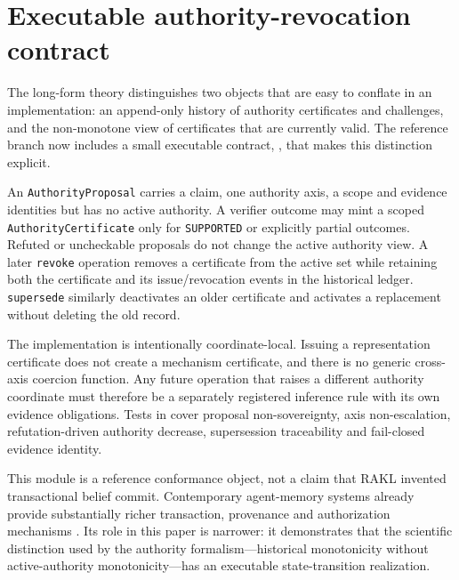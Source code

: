 \documentclass[11pt]{article}
\begin{document}
\section{Executable authority-revocation contract}

The long-form theory distinguishes two objects that are easy to conflate in an implementation: an append-only history of authority certificates and challenges, and the non-monotone view of certificates that are currently valid. The reference branch now includes a small executable contract, , that makes this distinction explicit.

An \texttt{AuthorityProposal} carries a claim, one authority axis, a scope and evidence identities but has no active authority. A verifier outcome may mint a scoped \texttt{AuthorityCertificate} only for \texttt{SUPPORTED} or explicitly partial outcomes. Refuted or uncheckable proposals do not change the active authority view. A later \texttt{revoke} operation removes a certificate from the active set while retaining both the certificate and its issue/revocation events in the historical ledger. \texttt{supersede} similarly deactivates an older certificate and activates a replacement without deleting the old record.

The implementation is intentionally coordinate-local. Issuing a representation certificate does not create a mechanism certificate, and there is no generic cross-axis coercion function. Any future operation that raises a different authority coordinate must therefore be a separately registered inference rule with its own evidence obligations. Tests in  cover proposal non-sovereignty, axis non-escalation, refutation-driven authority decrease, supersession traceability and fail-closed evidence identity.

This module is a reference conformance object, not a claim that RAKL invented transactional belief commit. Contemporary agent-memory systems already provide substantially richer transaction, provenance and authorization mechanisms \cite{memtx2026,ppmf2026,tmanm2026,committime2026}. Its role in this paper is narrower: it demonstrates that the scientific distinction used by the authority formalism---historical monotonicity without active-authority monotonicity---has an executable state-transition realization.
\end{document}
